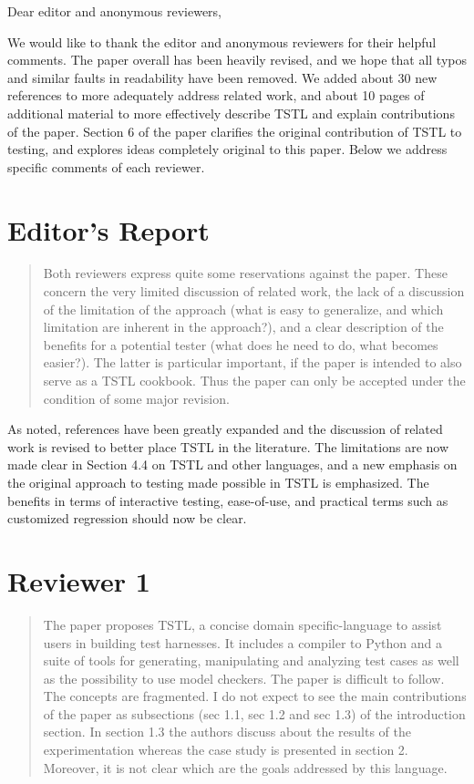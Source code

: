\documentclass{article}[12pt]
\begin{document}
\noindent Dear editor and anonymous reviewers,

\vspace{0.2in}

We would like to thank the editor and anonymous reviewers for their helpful comments.  The paper overall has been heavily revised, and we hope that all typos and similar faults in readability have been removed.
We added about 30 new references to more adequately address related work, and about 10 pages of additional material to more effectively describe TSTL and explain contributions of the paper.  Section 6 of the paper clarifies the original contribution of TSTL to testing, and explores ideas completely original to this paper.  Below we address specific comments of each reviewer.

\section{Editor's Report}

\begin{quote}
Both reviewers express quite some reservations against the paper.
These concern the very limited discussion of related work, the
lack of a discussion of the limitation of the approach (what is easy
to generalize, and which limitation are inherent in the approach?),
and a clear description of the benefits for a potential tester (what
does he need to do, what becomes easier?). The latter is particular
important, if the paper is intended to also serve as a TSTL cookbook.
Thus the paper can only be accepted under the condition of some
major revision. 
\end{quote}

As noted, references have been greatly expanded and the discussion of related work is revised to better place TSTL in the literature.
The limitations are now made clear in Section 4.4 on TSTL and other languages, and a new emphasis on the original approach to testing made possible in TSTL is emphasized.  The benefits in terms of interactive testing, ease-of-use, and practical terms such as customized regression should now be clear.

\section{Reviewer 1}

\begin{quote}
The paper proposes TSTL, a concise domain specific-language to assist users in building 
test harnesses. It includes a compiler to Python and a suite of tools for generating, 
manipulating and analyzing test cases as well as the possibility to use model checkers.
The paper is difficult to follow. The concepts are fragmented. I do not expect to see 
the main contributions of the paper as subsections (sec 1.1, sec 1.2 and sec 1.3) of 
the introduction section. In section 1.3 the authors discuss about the results of the 
experimentation whereas the case study is presented in section 2. Moreover, it is not 
clear which are the goals addressed by this language. 
\end{quote}
\end{document}
